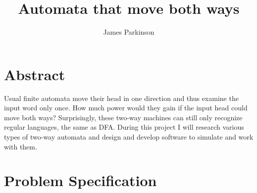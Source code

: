 \documentclass[12pt, a4paper]{article}
\title{Automata that move both ways}
\author{James Parkinson}
\begin{document}
\maketitle

\section{Abstract}

Usual finite automata move their head in one direction and thus examine the input word only once. How much power would they gain if the input head could move both ways? Surprisingly, these two-way machines can still only recognize regular languages, the same as DFA. During this project I will research various types of two-way automata and design and develop software to simulate and work with them.

\section{Problem Specification}
\end{document}
